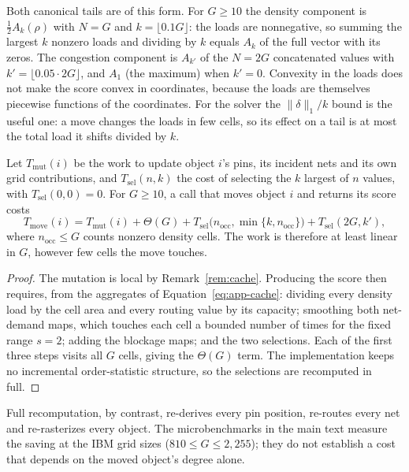 Both canonical tails are of this form. For $G\ge10$ the density component is
$\tfrac12A_k(\rho)$ with $N=G$ and $k=\lfloor0.1G\rfloor$: the loads are
nonnegative, so summing the largest $k$ nonzero loads and dividing by $k$ equals
$A_k$ of the full vector with its zeros. The congestion component is $A_{k'}$ of the
$N=2G$ concatenated values with $k'=\lfloor0.05\cdot2G\rfloor$, and $A_1$ (the
maximum) when $k'=0$. Convexity in the
loads does not make the score convex in coordinates, because the loads are
themselves piecewise functions of the coordinates. For the solver the
$\lVert\delta\rVert_1/k$ bound is the useful one: a move changes the loads in few
cells, so its effect on a tail is at most the total load it shifts divided by $k$.

\begin{appremark}\label{rem:move-cost}
Let $T_{\mathrm{mut}}(i)$ be the work to update object $i$'s pins, its incident nets
and its own grid contributions, and $T_{\mathrm{sel}}(n,k)$ the cost of selecting
the $k$ largest of $n$ values, with $T_{\mathrm{sel}}(0,0)=0$. For $G\ge10$, a call
that moves object $i$ and returns its score costs
\begin{equation*}
 T_{\mathrm{move}}(i)=T_{\mathrm{mut}}(i)+\Theta(G)
 +T_{\mathrm{sel}}\bigl(n_{\mathrm{occ}},\min\{k,n_{\mathrm{occ}}\}\bigr)
 +T_{\mathrm{sel}}(2G,k'),
\end{equation*}
where $n_{\mathrm{occ}}\le G$ counts nonzero density cells. The work is therefore at
least linear in $G$, however few cells the move touches.
\end{appremark}
\begin{proof}
The mutation is local by Remark~\ref{rem:cache}. Producing the score then requires,
from the aggregates of Equation~\eqref{eq:app-cache}: dividing every density load by
the cell area and every routing value by its capacity; smoothing both net-demand maps,
which touches each cell a bounded number of times for the fixed range $s=2$; adding
the blockage maps; and the two selections. Each of the first three steps visits all
$G$ cells, giving the $\Theta(G)$ term. The implementation keeps no incremental
order-statistic structure, so the selections are recomputed in full.
\end{proof}
Full recomputation, by contrast, re-derives every pin position, re-routes every net
and re-rasterizes every object. The microbenchmarks in the main text measure the
saving at the IBM grid sizes ($810\le G\le2{,}255$); they do not establish a cost that
depends on the moved object's degree alone.

